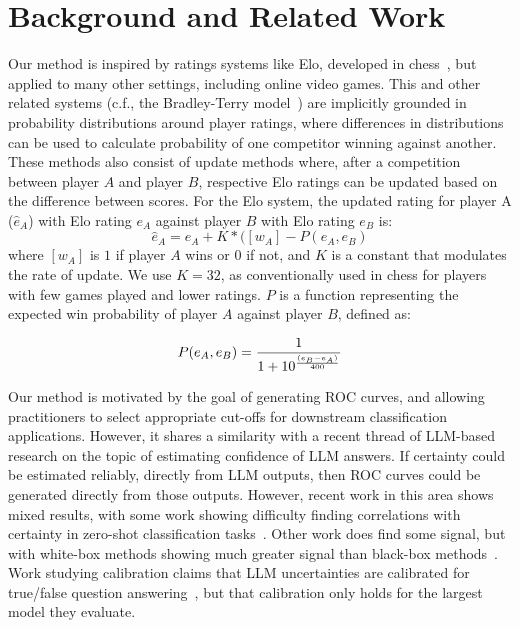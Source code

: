 \section{Background and Related Work}
Our method is inspired by ratings systems like Elo, developed in chess~\cite{elo1978rating}, but applied to many other settings, including online video games.
%
This and other related systems (c.f., the Bradley-Terry model~\cite{bradley_rank_1952}) are implicitly grounded in probability distributions around player ratings, where differences in distributions can be used to calculate probability of one competitor winning against another.
%
These methods also consist of update methods where, after a competition between player $A$ and player $B$, respective Elo ratings can be updated based on the difference between scores.
%
For the Elo system, the updated rating for player A ($\hat{e}_A$) with Elo rating $e_A$ against player $B$ with Elo rating $e_B$ is:
\begin{equation}
\label{eqn:update}
\hat{e}_A = e_A + K * ([w_A] - P(e_A, e_B)
\end{equation}
where $[w_A]$ is $1$ if player $A$ wins or $0$ if not, and $K$ is a constant that modulates the rate of update.
%
We use $K=32$, as conventionally used in chess for players with few games played and lower ratings.
%
$P$ is a function representing the expected win probability of player $A$ against player $B$, defined as:


\begin{equation}
P(e_A, e_B) = {1 \over 1 + 10^{(e_B-e_A) \over 400}}
\end{equation}

Our method is motivated by the goal of generating ROC curves, and allowing practitioners to select appropriate cut-offs for downstream classification applications.
%
However, it shares a similarity with a recent thread of LLM-based research on the topic of estimating confidence of LLM answers.
%
If certainty could be estimated reliably, directly from LLM outputs, then ROC curves could be generated directly from those outputs.
%
However, recent work in this area shows mixed results, with some work showing difficulty finding correlations with certainty in zero-shot classification tasks~\cite{gao_position_2024}.
%
Other work does find some signal, but with white-box methods showing much greater signal than black-box methods~\cite{savage_large_2024}.
%
Work studying calibration claims that LLM uncertainties are calibrated for true/false question answering~\cite{kadavath_language_2022}, but that calibration only holds for the largest model they evaluate.


